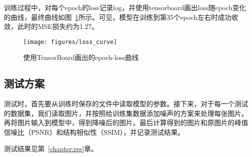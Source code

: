 训练过程中，对每个epoch的loss记录log，并使用tensorboard画出loss随epoch变化的曲线，最终曲线如图~\ref{fig:losscurve}所示。可见，模型在训练到第35个epoch左右时成功收敛，此时的MSE损失约为1.27。

\begin{figure}
	\centering
	\texttt{[image: figures/loss\_curve]}
	\caption{使用TensorBoard画出的epoch-loss曲线}
	\label{fig:losscurve}
\end{figure}

\subsection{测试方案}

测试时，首先要从训练时保存的文件中读取模型的参数。接下来，对于每一个测试的数据集，我们读取图片，并按照给训练集数据添加噪声的方案来处理每张图片。再将图片输入到模型中，得到降噪后的图片。最后计算得到的图片和原图片的峰值信噪比（PSNR）和结构相似性（SSIM），并记录测试结果。

测试结果见第~\ref{chapter:res}章。


